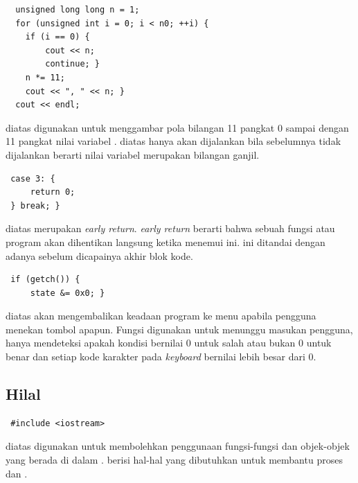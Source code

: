 \documentclass[../main.tex]{subfiles}
\begin{document}
\begin{lstlisting}
  unsigned long long n = 1;
  for (unsigned int i = 0; i < n0; ++i) {
  	if (i == 0) {
  		cout << n;
  		continue; }
  	n *= 11;
  	cout << ", " << n; }
  cout << endl;
\end{lstlisting}
    \vspace{-0.25ex}
    \ilz{}{\Script} diatas digunakan untuk menggambar pola bilangan 11 pangkat 0 sampai dengan 11 pangkat nilai variabel . {\Script} diatas hanya akan dijalankan bila {\script} sebelumnya tidak dijalankan berarti nilai variabel  merupakan bilangan ganjil.

\begin{lstlisting}
 case 3: {
     return 0;
 } break; }
\end{lstlisting}
    \vspace{-0.25ex}
    \ilz{}{\Script} diatas merupakan {\statement} \textit{early return}. {\Statement} \textit{early return} berarti bahwa sebuah fungsi atau program akan dihentikan langsung ketika menemui {\statement} ini. {\Statement} ini ditandai dengan adanya {\statement}  sebelum dicapainya akhir blok kode.

\begin{lstlisting}
 if (getch()) {
 	 state &= 0x0; }
\end{lstlisting}
    \vspace{-0.25ex}
    \ilz{}{\Script} diatas akan mengembalikan keadaan program ke menu apabila pengguna menekan tombol apapun. Fungsi  digunakan untuk menunggu masukan pengguna, {\statement}  hanya mendeteksi apakah kondisi bernilai 0 untuk salah atau bukan 0 untuk benar dan setiap kode karakter pada \textit{keyboard} bernilai lebih besar dari 0.

    \subsection{Hilal}
    \vspace{-0.25ex}
\begin{lstlisting}
 #include <iostream>
\end{lstlisting}
    \vspace{-0.25ex}
    \ilz{}{\Script} diatas digunakan untuk membolehkan penggunaan fungsi-fungsi dan objek-objek yang berada di dalam {\header} {\file} . {\Header} {\file}  berisi hal-hal yang dibutuhkan untuk membantu proses {\ioi} dan {\ioo}.
\end{document}
